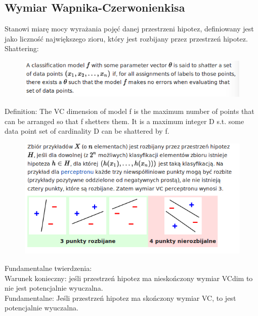 \documentclass[10pt,a4paper]{article}
\begin{document}
  \subsection{Wymiar Wapnika-Czerwonienkisa}
  Stanowi miarę mocy wyrażania pojęć danej przestrzeni hipotez, definiowany jest jako liczność największego zioru, który jest rozbijany przez przestrzeń hipotez. \\
  Shattering: \\
  \begin{figure}[H]
    \centering
      \includegraphics[scale=0.50]{images/shatter.png}
  \end{figure}
  Definition: The VC dimension of model f is the maximum number of points that can be arranged so that f shetters them. It is a maximum integer D s.t. some data point set of cardinality D can be shattered by f.
  \begin{figure}[H]
    \centering
      \includegraphics[scale=0.50]{images/rozbijanie.png}
  \end{figure}
  Fundamentalne twierdzenia: \\
  Warunek konieczny: jeśli przestrzeń hipotez ma nieskończony wymiar VCdim to nie jest potencjalnie wyuczalna. \\
  Fundamentalne: Jeśli przestrzeń hipotez ma skończony wymiar VC, to jest potencjalnie wyuczalna.
\end{document}
